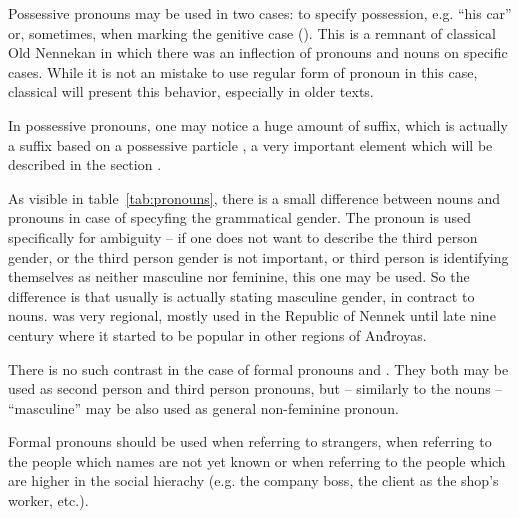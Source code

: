 Possessive pronouns may be used in two cases: to specify possession, e.g. ``his
car'' or, sometimes, when marking the genitive case (\Gen{}). This is a remnant
of classical Old Nennekan in which there was an inflection of pronouns and nouns
on specific cases. While it is not an mistake to use regular form of pronoun in
this case, classical  will present this behavior, especially
in older texts.


In possessive pronouns, one may notice a huge amount of  suffix, which
is actually a suffix based on a possessive particle , a very
important element which will be described in the section
.

As visible in table~\ref{tab:pronouns}, there is a small difference between
nouns and pronouns in case of specyfing the grammatical gender. The pronoun
 is used specifically for ambiguity -- if one does not want to
describe the third person gender, or the third person gender is not important,
or third person is identifying themselves as neither masculine nor feminine,
this one may be used. So the difference is that usually  is
actually stating masculine gender, in contract to nouns.  was very
regional, mostly used in the Republic of Nennek until late nine century where it
started to be popular in other regions of And́royas.

There is no such contrast in the case of formal pronouns  and
. They both may be used as second person and third person pronouns,
but -- similarly to the nouns -- ``masculine''  may be also used as
general non-feminine pronoun.

Formal pronouns should be used when referring to strangers, when referring to
the people which names are not yet known or when referring to the people which
are higher in the social hierachy (e.g. the company boss, the client as the
shop's worker, etc.).



